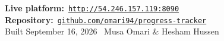 \documentclass[12pt,a4paper]{article}
\begin{document}
\vspace{0.8cm}
\begin{tcolorbox}[callout]
\begin{center}
\textbf{Live platform:}~\href{http://54.246.157.119:8090}{\texttt{http://54.246.157.119:8090}}
\quad\textbullet\quad
\textbf{Repository:}~\href{https://github.com/omari94/progress-tracker}{\texttt{github.com/omari94/progress-tracker}}\\[6pt]
\textcolor{inkfaint}{Built September 16, 2026 \textbullet\ Musa Omari \& Hesham Hussen}
\end{center}
\end{tcolorbox}
\end{document}
